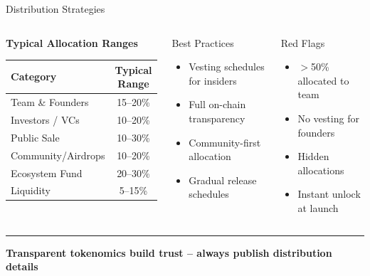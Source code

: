 \documentclass[8pt,aspectratio=169]{beamer}
\newcommand{\bottomnote}[1]{\vfill\vspace{-2mm}\textcolor{mllavender2}{\rule{\textwidth}{0.4pt}}\vspace{1mm}\footnotesize\textbf{#1}}
\begin{document}
\begin{frame}{Distribution Strategies}
  \begin{columns}[T]
      \begin{center}
      {\small\bfseries Typical Allocation Ranges}\\[4pt]
      \begin{tabular}{@{}lc@{}}
        \toprule
        \textbf{Category} & \textbf{Typical Range} \\
        \midrule
        Team \& Founders   & 15--20\% \\
        Investors / VCs    & 10--20\% \\
        Public Sale        & 10--30\% \\
        Community/Airdrops & 10--20\% \\
        Ecosystem Fund     & 20--30\% \\
        Liquidity          &  5--15\% \\
        \bottomrule
      \end{tabular}
      \end{center}

      \begin{block}{\textcolor{mlgreen}{\checkmark} Best Practices}
        \begin{itemize}\setlength\itemsep{1pt}
          \scriptsize
          \item[\textcolor{mlgreen}{\checkmark}] Vesting schedules for insiders
          \item[\textcolor{mlgreen}{\checkmark}] Full on-chain transparency
          \item[\textcolor{mlgreen}{\checkmark}] Community-first allocation
          \item[\textcolor{mlgreen}{\checkmark}] Gradual release schedules
        \end{itemize}
      \end{block}
      \begin{alertblock}{\textcolor{mlred}{\texttimes} Red Flags}
        \begin{itemize}\setlength\itemsep{1pt}
          \scriptsize
          \item[\textcolor{mlred}{\texttimes}] $>$50\% allocated to team
          \item[\textcolor{mlred}{\texttimes}] No vesting for founders
          \item[\textcolor{mlred}{\texttimes}] Hidden allocations
          \item[\textcolor{mlred}{\texttimes}] Instant unlock at launch
        \end{itemize}
      \end{alertblock}
  \end{columns}
  \bottomnote{Transparent tokenomics build trust -- always publish distribution details}
\end{frame}
\end{document}

